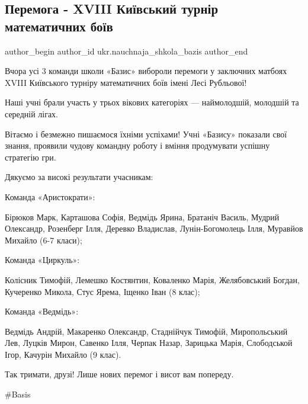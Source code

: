  
 
 
 
 
 
\subsection{Перемога - XVIII Київський турнір математичних боїв}
\label{sec:06_12_2021.fb.ukr.nauchnaja_shkola_bazis.1.matboj}
 
\ifcmt
 author_begin
   author_id ukr.nauchnaja_shkola_bazis
 author_end
\fi

Вчора усі 3 команди школи «Базис» вибороли перемоги у заключних матбоях XVIII
Київського турніру математичних боїв імені Лесі Рубльової!

Наші учні брали участь у трьох вікових категоріях — наймолодшій, молодшій та
середній лігах.


Вітаємо і безмежно пишаємося їхніми успіхами! Учні «Базису» показали свої
знання, проявили чудову командну роботу і вміння продумувати успішну стратегію
гри.

Дякуємо за високі результати учасникам:

Команда «Аристократи»:

Бірюков Марк, Карташова Софія, Ведмідь Ярина, Братаніч Василь, Мудрий
Олександр, Розенберг Ілля, Деревко Владислав, Лунін-Богомолець Ілля, Муравйов
Михайло (6-7 класи);

Команда «Циркуль»: 

Колісник Тимофій, Лемешко Костянтин, Коваленко Марія, Желябовський Богдан,
Кучеренко Микола, Стус Ярема, Іщенко Іван (8 клас);

Команда «Ведмідь»:

Ведмідь Андрій, Макаренко Олександр, Стаднійчук Тимофій, Миропольський Лев,
Луцків Мирон, Савенко Ілля, Черпак Назар, Зарицька Марія, Слободськой Ігор,
Качурін Михайло (9 клас).

Так тримати, друзі! Лише нових перемог і висот вам попереду.

\#Basis
